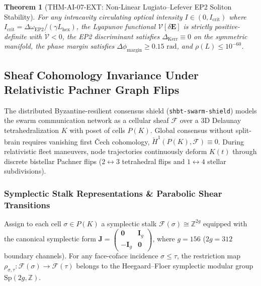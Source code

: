 \documentclass[11pt,onecolumn]{article}
\newtheorem{theorem}{Theorem}
\begin{document}
\begin{theorem}[THM-AI-07-EXT: Non-Linear Lugiato--Lefever EP2 Soliton Stability]
\label{thm:thm_ai_07_ext}
For any intracavity circulating optical intensity $I \in (0, I_{\mathrm{crit}})$ where $I_{\mathrm{crit}} = \Delta\omega_{\mathrm{EP2}} / (\gamma L_{\mathrm{hex}})$, the Lyapunov functional $\mathcal{V}[\delta\mathbf{E}]$ is strictly positive-definite with $\dot{\mathcal{V}} < 0$, the EP2 discriminant satisfies $\Delta_{\mathrm{Kerr}} \equiv 0$ on the symmetric manifold, the phase margin satisfies $\Delta\phi_{\mathrm{margin}} \ge 0.15\text{ rad}$, and $\rho(L) \le 10^{-60}$.
\end{theorem}

\FloatBarrier
\subsection{Sheaf Cohomology Invariance Under Relativistic Pachner Graph Flips}
\label{sec:pachner_sheaf}

The distributed Byzantine-resilient consensus shield (\texttt{shbt-swarm-shield}) models the swarm communication network as a cellular sheaf $\mathcal{F}$ over a 3D Delaunay tetrahedralization $K$ with poset of cells $P(K)$. Global consensus without split-brain requires vanishing first \v{C}ech cohomology, $\check{H}^1(P(K), \mathcal{F}) \equiv 0$. During relativistic fleet maneuvers, node trajectories continuously deform $K(t)$ through discrete bistellar Pachner flips ($2 \leftrightarrow 3$ tetrahedral flips and $1 \leftrightarrow 4$ stellar subdivisions).

\subsubsection{Symplectic Stalk Representations \& Parabolic Shear Transitions}
Assign to each cell $\sigma \in P(K)$ a symplectic stalk $\mathcal{F}(\sigma) \cong \mathbb{Z}^{2g}$ equipped with the canonical symplectic form $\mathbf{J} = \begin{pmatrix} \mathbf{0} & \mathbf{I}_g \\ -\mathbf{I}_g & \mathbf{0} \end{pmatrix}$, where $g = 156$ ($2g = 312$ boundary channels). For any face-coface incidence $\sigma \leqslant \tau$, the restriction map $\rho_{\sigma,\tau}: \mathcal{F}(\sigma) \to \mathcal{F}(\tau)$ belongs to the Heegaard--Floer symplectic modular group $\mathrm{Sp}(2g, \mathbb{Z})$.
\end{document}
